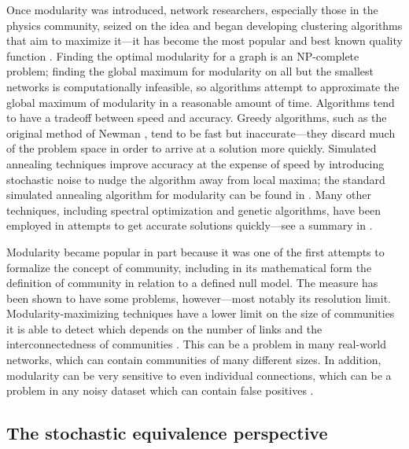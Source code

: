Once modularity was introduced, network researchers, especially those in
the physics community, seized on the idea and began developing
clustering algorithms that aim to maximize it---it has become the most
popular and best known quality function
\autocite{fortunato_community_2010}. Finding the optimal modularity for
a graph is an NP-complete problem; finding the global maximum for
modularity on all but the smallest networks is computationally
infeasible, so algorithms attempt to approximate the global maximum of
modularity in a reasonable amount of time. Algorithms tend to have a
tradeoff between speed and accuracy. Greedy algorithms, such as the
original method of Newman \autocite{newman_fast_2004}, tend to be fast
but inaccurate---they discard much of the problem space in order to
arrive at a solution more quickly. Simulated annealing techniques
improve accuracy at the expense of speed by introducing stochastic noise
to nudge the algorithm away from local maxima; the standard simulated
annealing algorithm for modularity can be found in
\autocite{guimera_functional_2005}. Many other techniques, including
spectral optimization and genetic algorithms, have been employed in
attempts to get accurate solutions quickly---see a summary in
\autocite{fortunato_community_2010}.

Modularity became popular in part because it was one of the first
attempts to formalize the concept of community, including in its
mathematical form the definition of community in relation to a defined
null model. The measure has been shown to have some problems,
however---most notably its resolution limit. Modularity-maximizing
techniques have a lower limit on the size of communities it is able to
detect which depends on the number of links and the interconnectedness
of communities \autocite{fortunato_resolution_2007}. This can be a
problem in many real-world networks, which can contain communities of
many different sizes. In addition, modularity can be very sensitive to
even individual connections, which can be a problem in any noisy dataset
which can contain false positives \autocite{fortunato_community_2010}.

\hypertarget{the-stochastic-equivalence-perspective}{\subsection{The
stochastic equivalence
perspective}\label{the-stochastic-equivalence-perspective}}

